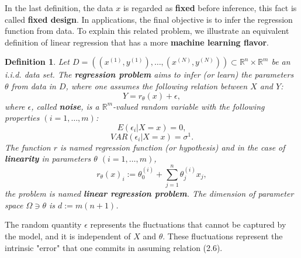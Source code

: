 \documentclass{report}
\newtheorem{definition}{Definition}[chapter]
\begin{document}
In the last definition, the data $x$ is regarded as \textbf{fixed} before inference, this fact is called \textbf{fixed design}. In applications, the final objective is to infer the regression function from data. To explain this related problem, we illustrate an equivalent definition of linear regression that has a more \textbf{machine learning flavor}.

\begin{definition}
Let $D = ((x^{(1)},y^{(1)}),\dots,(x^{(N)},y^{(N)})) \subset \mathbb{R}^n \times \mathbb{R}^m$ be an i.i.d. data set. The \textbf{regression problem} aims to infer (or learn) the parameters $\theta$ from data in $D$, where one assumes the following relation between $X$ and $Y$: 
\begin{equation}
Y = r_\theta(x) + \epsilon,
\end{equation}
where $\epsilon$, called \textbf{noise}, is a $\mathbb{R}^m$-valued random variable with the following properties $(i = 1,\dots,m)$:
\begin{equation}
E(\epsilon_i|X = x) = 0,
\end{equation}
\begin{equation}
VAR(\epsilon_i|X = x) = \sigma^1.
\end{equation}
The function $r$ is named regression function (or hypothesis) and in the case of \textbf{linearity} in parameters $\theta$ $(i = 1,\dots,m)$,
\begin{equation}
r_\theta(x)_i :=  \theta_0^{(i)} + \sum_{j=1}^{n}\theta^{(i)}_jx_j,
\end{equation}
the problem is named \textbf{linear regression problem}. The dimension of parameter space $\Omega \ni \theta$ is $d:= m(n+1)$.
\end{definition}

The random quantity $\epsilon$ represents the fluctuations that cannot be captured by the model, and it is independent of $X$ and $\theta$. These fluctuations represent the intrinsic "error" that one commits in assuming relation (2.6).
\end{document}
